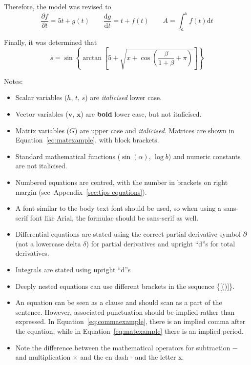 \documentclass[a5paper, 10pt]{article}
\begin{document}
Therefore, the model was revised to
\begin{equation}
  \frac{\partial f}{\partial t} = 5t + g(t) \qquad \frac{\mathrm{d} g}{\mathrm{d} t} = t + f(t) \qquad A = \int_a^b f(t) \mathrm{d} t
\end{equation}

Finally, it was determined that
\begin{equation}
  s = \sin\left \{ \arctan \left [  5 +  \sqrt{x + \cos\left(\frac{\beta}{1+\beta} + \pi\right)} \right ] \right \}
\end{equation}

Notes:
\begin{itemize}
\item Scalar variables ($h$, $t$, $s$) are \emph{italicised} lower case.
\item Vector variables ($\mathbf{v}$, $\mathbf{x}$) are \textbf{bold}
  lower case, but not italicised.
\item Matrix variables ($G$) are upper case and \emph{italicised}.
  Matrices are shown in Equation~\ref{eq:matexample}, with block
  brackets.
\item Standard mathematical functions ($\sin(\alpha)$, $\log b$) and
  numeric constants are not italicised.
\item Numbered equations are centred, with the number in brackets on
  right margin (see~Appendix~\ref{sec:tips-equations}).
\item A font similar to the body text font should be used, so when
  using a sans-serif font like Arial, the formulae should be
  sans-serif as well.
\item Differential equations are stated using the correct partial
  derivative symbol $\partial$ (not a lowercase delta $\delta$) for
  partial derivatives and upright ``d''s  for total derivatives.
\item Integrals are stated using upright ``d''s
\item Deeply nested equations can use different brackets in the
  sequence \{[()]\}.
\item An equation can be seen as a clause and should scan as a part of
  the sentence.  However, associated punctuation should be implied
  rather than expressed.  In Equation~\ref{eq:commaexample}, there is
  an implied comma after the equation, while in
  Equation~\ref{eq:matexample} there is an implied period.
\item Note the difference between the mathematical operators for subtraction $-$ and multiplication $\times$ and the en dash - and the letter x. 
\end{itemize}
\end{document}
